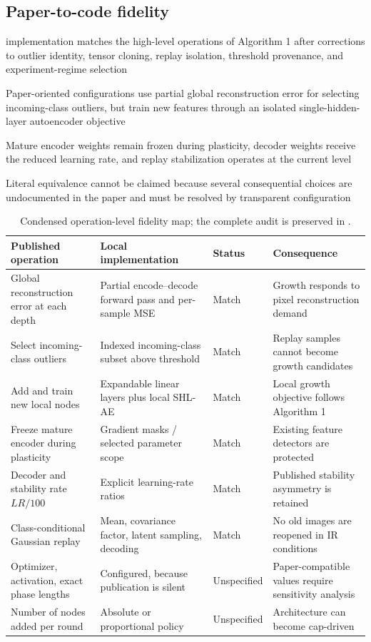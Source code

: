 \subsection{Paper-to-code fidelity}
\begin{draftpoints}
  \item implementation matches the high-level operations of Algorithm 1 after corrections to outlier identity, tensor cloning, replay isolation, threshold provenance, and experiment-regime selection
  \item Paper-oriented configurations use partial global reconstruction error for selecting incoming-class outliers, but train new features through an isolated single-hidden-layer autoencoder objective
  \item Mature encoder weights remain frozen during plasticity, decoder weights receive the reduced learning rate, and replay stabilization operates at the current level
  \item Literal equivalence cannot be claimed because several consequential choices are undocumented in the paper and must be resolved by transparent configuration
\end{draftpoints}

\begin{table}[htbp]
\centering
\caption{Condensed operation-level fidelity map; the complete audit is preserved in .}
\label{tab:fidelity-map}
\small
\begin{tabularx}{\textwidth}{p{3.9cm}p{4.4cm}p{1.9cm}Y}
\toprule
Published operation & Local implementation & Status & Consequence \\
\midrule
Global reconstruction error at each depth & Partial encode--decode forward pass and per-sample MSE & Match & Growth responds to pixel reconstruction demand \\
Select incoming-class outliers & Indexed incoming-class subset above threshold & Match & Replay samples cannot become growth candidates \\
Add and train new local nodes & Expandable linear layers plus local SHL-AE & Match & Local growth objective follows Algorithm 1 \\
Freeze mature encoder during plasticity & Gradient masks / selected parameter scope & Match & Existing feature detectors are protected \\
Decoder and stability rate $LR/100$ & Explicit learning-rate ratios & Match & Published stability asymmetry is retained \\
Class-conditional Gaussian replay & Mean, covariance factor, latent sampling, decoding & Match & No old images are reopened in IR conditions \\
Optimizer, activation, exact phase lengths & Configured, because publication is silent & Unspecified & Paper-compatible values require sensitivity analysis \\
Number of nodes added per round & Absolute or proportional policy & Unspecified & Architecture can become cap-driven \\
\bottomrule
\end{tabularx}
\end{table}

